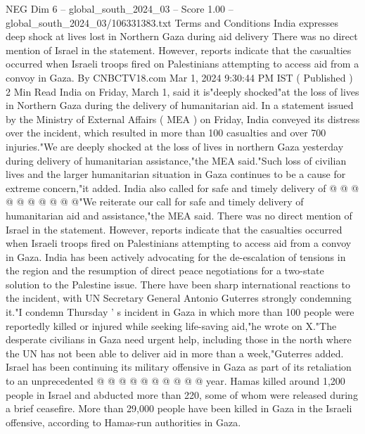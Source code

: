 \begin{textsample}{NEG Dim 6 – global\_south\_2024\_03 – Score 1.00 – global\_south\_2024\_03/106331383.txt}  \label{ex:f6_neg_410}
Terms and Conditions India expresses deep shock at lives lost in Northern Gaza during aid delivery There was no direct mention of Israel in the statement.
However, reports indicate that the casualties occurred when Israeli troops fired on Palestinians attempting to access aid from a convoy in Gaza.
By CNBCTV18.com Mar 1, 2024 9:30:44 PM IST ( Published ) 2 Min Read India on Friday, March 1, said it is"deeply shocked"at the loss of lives in Northern Gaza during the delivery of humanitarian aid.
In a statement issued by the Ministry of External Affairs ( MEA ) on Friday, India conveyed its distress over the incident, which resulted in more than 100 casualties and over 700 injuries."We are deeply shocked at the loss of lives in northern Gaza yesterday during delivery of humanitarian assistance,"the MEA said."Such loss of civilian lives and the larger humanitarian situation in Gaza continues to be a cause for extreme concern,"it added.
India also called for safe and timely delivery of @ @ @ @ @ @ @ @ @ @"We reiterate our call for safe and timely delivery of humanitarian aid and assistance,"the MEA said.
There was no direct mention of Israel in the statement.
However, reports indicate that the casualties occurred when Israeli troops fired on Palestinians attempting to access aid from a convoy in Gaza.
India has been actively advocating for the de-escalation of tensions in the region and the resumption of direct peace negotiations for a two-state solution to the Palestine issue.
There have been sharp international reactions to the incident, with UN Secretary General Antonio Guterres strongly condemning it."I condemn Thursday ' s incident in Gaza in which more than 100 people were reportedly killed or injured while seeking life-saving aid,"he wrote on X."The desperate civilians in Gaza need urgent help, including those in the north where the UN has not been able to deliver aid in more than a week,"Guterres added.
Israel has been continuing its military offensive in Gaza as part of its retaliation to an unprecedented @ @ @ @ @ @ @ @ @ @ year.
Hamas killed around 1,200 people in Israel and abducted more than 220, some of whom were released during a brief ceasefire.
More than 29,000 people have been killed in Gaza in the Israeli offensive, according to Hamas-run authorities in Gaza.

\end{textsample}
